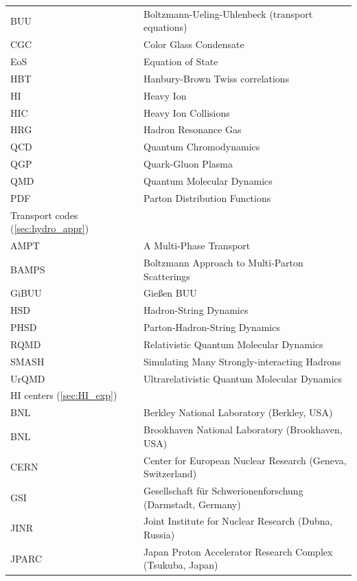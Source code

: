 \begin{table}
  \begin{tabular}{ll}
    \toprule
    BUU  &   Boltzmann-Ueling-Uhlenbeck (transport equations) \\
    CGC  &   Color Glass Condensate \cite{Gelis:2010nm,Iancu:2003xm} \\
    EoS  &   Equation of State \\
    HBT  &   Hanbury-Brown Twiss correlations \cite{Lisa:2005dd} \\
    HI   &   Heavy Ion \\
    HIC  &   Heavy Ion Collisions \\
    HRG  &   Hadron Resonance Gas \\
    QCD  &   Quantum Chromodynamics \\
    QGP  &   Quark-Gluon Plasma \\
    QMD  &   Quantum Molecular Dynamics \\
    PDF  &   Parton Distribution Functions \cite{Pumplin:2002vw,Gluck:1994uf} \\
    \midrule
    Transport codes (\ref{sec:hydro_appr}) \\
    \midrule
    AMPT  & A Multi-Phase Transport \\
    BAMPS & Boltzmann Approach to Multi-Parton Scatterings \\
    GiBUU & Gie{\ss}en BUU \\
    HSD   & Hadron-String Dynamics \\
    PHSD  & Parton-Hadron-String Dynamics \\
    RQMD  & Relativistic Quantum Molecular Dynamics \\
    SMASH & Simulating Many Strongly-interacting Hadrons \\
    UrQMD & Ultrarelativistic Quantum Molecular Dynamics \\
    \midrule
    HI centers (\ref{sec:HI_exp}) \\
    \midrule
    BNL   &  Berkley National Laboratory (Berkley, USA) \\
    BNL   &  Brookhaven National Laboratory (Brookhaven, USA) \\
    CERN  &  Center for European Nuclear Research (Geneva, Switzerland) \\
    GSI   &  Gesellschaft f\"ur Schwerionenforschung (Darmstadt, Germany) \\
    JINR  &  Joint Institute for Nuclear Research (Dubna, Russia) \\
    JPARC &  Japan Proton Accelerator Research Complex (Tsukuba, Japan) \\

\end{tabular}
\end{table}
